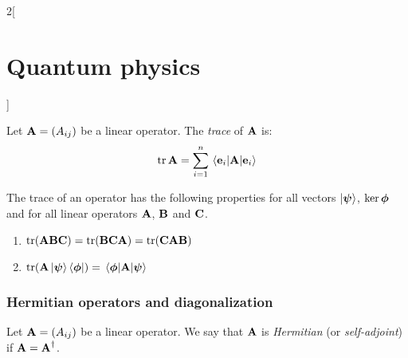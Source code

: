 \documentclass[../../../main.tex]{subfiles}
\begin{document}
\begin{multicols}{2}[\section{Quantum physics}]
\begin{definition}
    Let $\boldsymbol{\mathrm{A}}=(A_{ij})$ be a linear operator. The \emph{trace} of $\boldsymbol{\mathrm{A}}$ is: $$\trace\vf{A}=\sum_{i=1}^n\mel{\vf{e}_i}{\vf{A}}{\vf{e}_i}$$
  \end{definition}
  \begin{proposition}
    The trace of an operator has the following properties for all vectors $\ket{\boldsymbol{\mathrm{\psi}}}$, $\ker{\boldsymbol{\mathrm{\phi}}}$ and for all linear operators $\boldsymbol{\mathrm{A}}$, $\boldsymbol{\mathrm{B}}$ and $\boldsymbol{\mathrm{C}}$.
    \begin{enumerate}
      \item $\trace(\vf{ABC})=\trace(\vf{BCA})=\trace(\vf{CAB})$
      \item $\trace(\vf{A}\ket{\vf\psi}\bra{\vf\phi})=\mel{\vf\phi}{\vf{A}}{\vf\psi}$
    \end{enumerate}
  \end{proposition}
  \subsubsection{Hermitian operators and diagonalization}
  \begin{definition}
    Let $\boldsymbol{\mathrm{A}}=(A_{ij})$ be a linear operator. We say that $\boldsymbol{\mathrm{A}}$ is \emph{Hermitian} (or \emph{self-adjoint}) if $\boldsymbol{\mathrm{A}}=\boldsymbol{\mathrm{A}}^\dag$.
  \end{definition}
\end{multicols}
\end{document}
